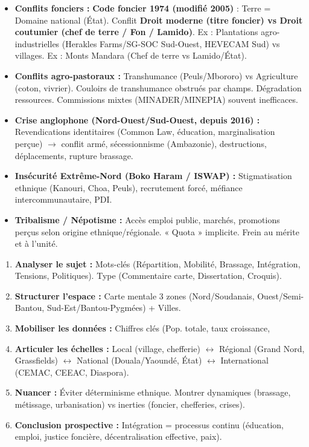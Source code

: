 \documentclass[11pt]{article}
\begin{document}
\begin{itemize}
    \item \textbf{Conflits fonciers :} \textbf{Code foncier 1974 (modifié 2005)} : Terre = Domaine national (État). Conflit \textbf{Droit moderne (titre foncier) vs Droit coutumier (chef de terre / Fon / Lamido)}. Ex : Plantations agro-industrielles (Herakles Farms/SG-SOC Sud-Ouest, HEVECAM Sud) vs villages. Ex : Monts Mandara (Chef de terre vs Lamido/État).
    \item \textbf{Conflits agro-pastoraux :} Transhumance (Peuls/Mbororo) vs Agriculture (coton, vivrier). Couloirs de transhumance obstrués par champs. Dégradation ressources. Commissions mixtes (MINADER/MINEPIA) souvent inefficaces.
    \item \textbf{Crise anglophone (Nord-Ouest/Sud-Ouest, depuis 2016) :} Revendications identitaires (Common Law, éducation, marginalisation perçue) $\rightarrow$ conflit armé, sécessionnisme (Ambazonie), destructions, déplacements, rupture brassage.
    \item \textbf{Insécurité Extrême-Nord (Boko Haram / ISWAP) :} Stigmatisation ethnique (Kanouri, Choa, Peuls), recrutement forcé, méfiance intercommunautaire, PDI.
    \item \textbf{Tribalisme / Népotisme :} Accès emploi public, marchés, promotions perçus selon origine ethnique/régionale. « Quota » implicite. Frein au mérite et à l'unité.
\end{itemize}

\begin{methode}
\begin{enumerate}
    \item \textbf{Analyser le sujet :} Mots-clés (Répartition, Mobilité, Brassage, Intégration, Tensions, Politiques). Type (Commentaire carte, Dissertation, Croquis).
    \item \textbf{Structurer l'espace :} Carte mentale 3 zones (Nord/Soudanais, Ouest/Semi-Bantou, Sud-Est/Bantou-Pygmées) + Villes.
    \item \textbf{Mobiliser les données :} Chiffres clés (Pop. totale, taux croissance, %
    \item \textbf{Articuler les échelles :} Local (village, chefferie) $\leftrightarrow$ Régional (Grand Nord, Grassfields) $\leftrightarrow$ National (Douala/Yaoundé, État) $\leftrightarrow$ International (CEMAC, CEEAC, Diaspora).
    \item \textbf{Nuancer :} Éviter déterminisme ethnique. Montrer dynamiques (brassage, métissage, urbanisation) vs inerties (foncier, chefferies, crises).
    \item \textbf{Conclusion prospective :} Intégration = processus continu (éducation, emploi, justice foncière, décentralisation effective, paix).
\end{enumerate}
\end{methode}
\end{document}
